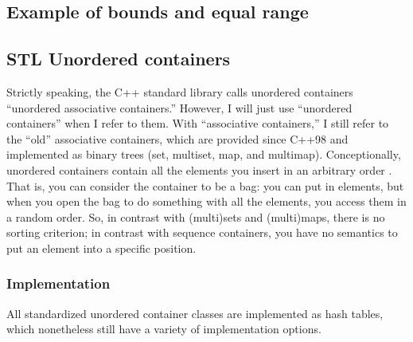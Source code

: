 \documentclass{report}
\begin{document}
\pagebreak 
\subsection{Example of bounds and equal range}








   \pagebreak 
   \subsection{STL Unordered containers}
   \bigbreak \noindent 
   Strictly speaking, the C++ standard library calls unordered containers “unordered associative
containers.” However, I will just use “unordered containers” when I refer to them. With “associative
containers,” I still refer to the “old” associative containers, which are provided since C++98 and
implemented as binary trees (set, multiset, map, and multimap).
\bigbreak \noindent 
Conceptionally, unordered containers contain all the elements you insert in an arbitrary order . That is, you can consider the container to be a bag: you can put in elements,
but when you open the bag to do something with all the elements, you access them in a random
order. So, in contrast with (multi)sets and (multi)maps, there is no sorting criterion; in contrast with
sequence containers, you have no semantics to put an element into a specific position.
\bigbreak \noindent 
\subsubsection{Implementation}
\bigbreak \noindent 
All standardized unordered container classes are implemented as hash tables, which nonetheless still have a variety of implementation options.
\bigbreak \noindent 
\end{document}
